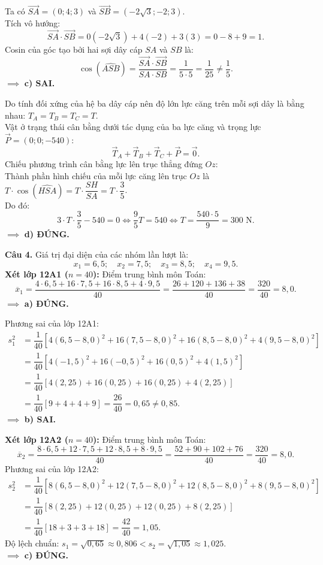 \documentclass[12pt,a4paper]{article}
\begin{document}
Ta có $\vec{SA} = (0; 4; 3)$ và $\vec{SB} = (-2\sqrt{3}; -2; 3)$.\\
Tích vô hướng:
\[
\vec{SA} \cdot \vec{SB} = 0(-2\sqrt{3}) + 4(-2) + 3(3) = 0 - 8 + 9 = 1.
\]
Cosin của góc tạo bởi hai sợi dây cáp $SA$ và $SB$ là:
\[
\cos(\widehat{ASB}) = \dfrac{\vec{SA} \cdot \vec{SB}}{SA \cdot SB} = \dfrac{1}{5 \cdot 5} = \dfrac{1}{25} \ne \dfrac{1}{5}.
\]
$\implies$ \textbf{c) SAI.}

Do tính đối xứng của hệ ba dây cáp nên độ lớn lực căng trên mỗi sợi dây là bằng nhau: $T_A = T_B = T_C = T$.\\
Vật ở trạng thái cân bằng dưới tác dụng của ba lực căng và trọng lực $\vec{P} = (0; 0; -540)$:
\[
\vec{T}_A + \vec{T}_B + \vec{T}_C + \vec{P} = \vec{0}.
\]
Chiếu phương trình cân bằng lực lên trục thẳng đứng $Oz$:\\
Thành phần hình chiếu của mỗi lực căng lên trục $Oz$ là $T \cdot \cos(\widehat{HSA}) = T \cdot \dfrac{SH}{SA} = T \cdot \dfrac{3}{5}$.\\
Do đó:
\[
3 \cdot T \cdot \dfrac{3}{5} - 540 = 0 \iff \dfrac{9}{5}T = 540 \iff T = \dfrac{540 \cdot 5}{9} = 300\text{ N}.
\]
$\implies$ \textbf{d) ĐÚNG.}

\vspace{0.3cm}
\noindent\textbf{Câu 4.}
Giá trị đại diện của các nhóm lần lượt là:
\[
x_1 = 6{,}5;\quad x_2 = 7{,}5;\quad x_3 = 8{,}5;\quad x_4 = 9{,}5.
\]
\textbf{Xét lớp 12A1 ($n = 40$):}
Điểm trung bình môn Toán:
\[
\overline{x}_1 = \dfrac{4 \cdot 6{,}5 + 16 \cdot 7{,}5 + 16 \cdot 8{,}5 + 4 \cdot 9{,}5}{40} = \dfrac{26 + 120 + 136 + 38}{40} = \dfrac{320}{40} = 8{,}0.
\]
$\implies$ \textbf{a) ĐÚNG.}

Phương sai của lớp 12A1:
\begin{align*}
s_1^2 &= \dfrac{1}{40} \left[ 4(6{,}5 - 8{,}0)^2 + 16(7{,}5 - 8{,}0)^2 + 16(8{,}5 - 8{,}0)^2 + 4(9{,}5 - 8{,}0)^2 \right] \\
&= \dfrac{1}{40} \left[ 4(-1{,}5)^2 + 16(-0{,}5)^2 + 16(0{,}5)^2 + 4(1{,}5)^2 \right] \\
&= \dfrac{1}{40} \left[ 4(2{,}25) + 16(0{,}25) + 16(0{,}25) + 4(2{,}25) \right] \\
&= \dfrac{1}{40} \left[ 9 + 4 + 4 + 9 \right] = \dfrac{26}{40} = 0{,}65 \ne 0{,}85.
\end{align*}
$\implies$ \textbf{b) SAI.}

\textbf{Xét lớp 12A2 ($n = 40$):}
Điểm trung bình môn Toán:
\[
\overline{x}_2 = \dfrac{8 \cdot 6{,}5 + 12 \cdot 7{,}5 + 12 \cdot 8{,}5 + 8 \cdot 9{,}5}{40} = \dfrac{52 + 90 + 102 + 76}{40} = \dfrac{320}{40} = 8{,}0.
\]
Phương sai của lớp 12A2:
\begin{align*}
s_2^2 &= \dfrac{1}{40} \left[ 8(6{,}5 - 8{,}0)^2 + 12(7{,}5 - 8{,}0)^2 + 12(8{,}5 - 8{,}0)^2 + 8(9{,}5 - 8{,}0)^2 \right] \\
&= \dfrac{1}{40} \left[ 8(2{,}25) + 12(0{,}25) + 12(0{,}25) + 8(2{,}25) \right] \\
&= \dfrac{1}{40} \left[ 18 + 3 + 3 + 18 \right] = \dfrac{42}{40} = 1{,}05.
\end{align*}
Độ lệch chuẩn: $s_1 = \sqrt{0{,}65} \approx 0{,}806 < s_2 = \sqrt{1{,}05} \approx 1{,}025$.\\
$\implies$ \textbf{c) ĐÚNG.}
\end{document}
